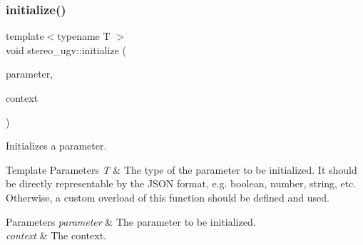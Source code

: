 \subsubsection{\texorpdfstring{initialize()}{initialize()}}
{\footnotesize\ttfamily template$<$typename T $>$ \\
void stereo\+\_\+ugv\+::initialize (\begin{DoxyParamCaption}\item[{T $\ast$}]{parameter,  }\item[{const \hyperlink{classstereo__ugv_1_1Context}{Context} \&}]{context }\end{DoxyParamCaption})\hspace{0.3cm}{\ttfamily [inline]}}



Initializes a parameter. 


\begin{DoxyTemplParams}{Template Parameters}
{\em T} & The type of the parameter to be initialized. It should be directly representable by the J\+S\+ON format, e.\+g. boolean, number, string, etc. Otherwise, a custom overload of this function should be defined and used. \\
\hline
\end{DoxyTemplParams}

\begin{DoxyParams}{Parameters}
{\em parameter} & The parameter to be initialized. \\
\hline
{\em context} & The context. \\
\hline
\end{DoxyParams}
